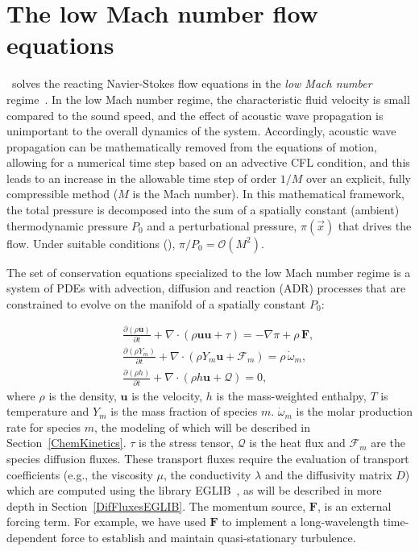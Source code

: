 \section{The low Mach number flow equations}
\newcommand{\etal}{{\it et al.}}

\pelelm\ solves the reacting Navier-Stokes flow equations in the \emph{low Mach number} regime~\cite{DayBell:2000,rehm1978equations,Majda:1985}. In the low Mach number regime, the characteristic fluid velocity is small compared to the sound speed, and the effect of acoustic wave propagation is unimportant to the overall dynamics of the system. Accordingly, acoustic wave propagation can be mathematically removed from the equations of motion, allowing for a numerical time step based on an advective CFL condition, and this leads to an increase in the allowable time step of order $1/M$ over an explicit, fully compressible method ($M$ is the Mach number).  In this mathematical framework, the total pressure is decomposed into the sum of a spatially constant (ambient) thermodynamic pressure $P_0$ and a perturbational pressure, $\pi({\vec x})$ that drives the flow.  Under suitable conditions (\cite{Majda:1985}), $\pi/P_0 = \mathcal{O} (M^2)$. 

The set of conservation equations specialized to the low Mach number regime is a system of PDEs with advection, diffusion and reaction (ADR) processes that are constrained to evolve on the manifold of a spatially constant $P_0$:

\begin{eqnarray}
&&\frac{\partial (\rho \boldsymbol{u})}{\partial t} + 
\nabla \cdot \left(\rho  \boldsymbol{u} \boldsymbol{u} + \tau \right)
= -\nabla \pi + \rho \, \boldsymbol{F}  ,
\nonumber
\\
&&\frac{\partial (\rho Y_m)}{\partial t} +
\nabla \cdot \left( \rho Y_m \boldsymbol{u} + \boldsymbol{\mathcal{F}}_{m} \right)
= \rho \, \dot{\omega}_m,
\label{eq:gen}
\\
&&\frac{ \partial (\rho h)}{ \partial t} +
\nabla \cdot \left( \rho h \boldsymbol{u} + \boldsymbol{\mathcal{Q}} \right) = 0 ,
\nonumber
\end{eqnarray}
where $\rho$ is the density, $\boldsymbol{u}$ is the velocity, $h$ is the mass-weighted enthalpy, $T$ is temperature and $Y_m$ is the mass fraction of species $m$. $\dot{\omega}_m$ is the molar production rate for species $m$, the modeling of which will be described in Section~\ref{ChemKinetics}. $\tau$ is the stress tensor, $\boldsymbol{\mathcal{Q}}$ is the heat flux and $\boldsymbol{\mathcal{F}}_m$
are the species diffusion fluxes. These transport fluxes require the evaluation of transport coefficients (e.g., the viscosity $\mu$, the conductivity $\lambda$ and the diffusivity matrix $D$) which are computed using the library EGLIB~\cite{EGLIB}, as will be described in more depth in Section~\ref{DifFluxesEGLIB}. The momentum source, $\boldsymbol{F}$, is an external forcing term.  For example, we have used $\boldsymbol{F}$ to implement a long-wavelength time-dependent force to establish and maintain quasi-stationary turbulence.


